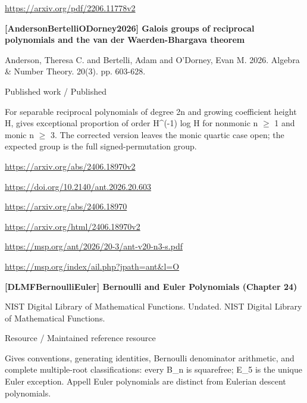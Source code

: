 \documentclass[11pt,a4paper,oneside,openany]{book}
\begin{document}
{\footnotesize\url{https://arxiv.org/pdf/2206.11778v2}}\par
\vspace{9pt}
\hypertarget{ref:AndersonBertelliODorney2026}{}
{\sffamily\bfseries\color{atlasgreen}[AndersonBertelliODorney2026] Galois groups of reciprocal polynomials and the van der Waerden-Bhargava theorem}\par
\color{black} Anderson, Theresa C. and Bertelli, Adam and O'Dorney, Evan M. 2026. Algebra \& Number Theory. 20(3). pp. 603-628.\par
{\small\sffamily\color{atlasgold}Published work / Published}\par
\color{black} For separable reciprocal polynomials of degree 2n and growing coefficient height H, gives exceptional proportion of order H\textasciicircum{}(-1) log H for nonmonic n \ensuremath{\ge} 1 and monic n \ensuremath{\ge} 3. The corrected version leaves the monic quartic case open; the expected group is the full signed-permutation group.\par
{\footnotesize\url{https://arxiv.org/abs/2406.18970v2}}\par
{\footnotesize\url{https://doi.org/10.2140/ant.2026.20.603}}\par
{\footnotesize\url{https://arxiv.org/abs/2406.18970}}\par
{\footnotesize\url{https://arxiv.org/html/2406.18970v2}}\par
{\footnotesize\url{https://msp.org/ant/2026/20-3/ant-v20-n3-s.pdf}}\par
{\footnotesize\url{https://msp.org/index/ail.php?jpath=ant&l=O}}\par
\vspace{9pt}
\hypertarget{ref:DLMFBernoulliEuler}{}
{\sffamily\bfseries\color{atlasgreen}[DLMFBernoulliEuler] Bernoulli and Euler Polynomials (Chapter 24)}\par
\color{black} NIST Digital Library of Mathematical Functions. Undated. NIST Digital Library of Mathematical Functions.\par
{\small\sffamily\color{atlasgold}Resource / Maintained reference resource}\par
\color{black} Gives conventions, generating identities, Bernoulli denominator arithmetic, and complete multiple-root classifications: every B\_\allowbreak{}n is squarefree; E\_\allowbreak{}5 is the unique Euler exception. Appell Euler polynomials are distinct from Eulerian descent polynomials.\par
\end{document}
